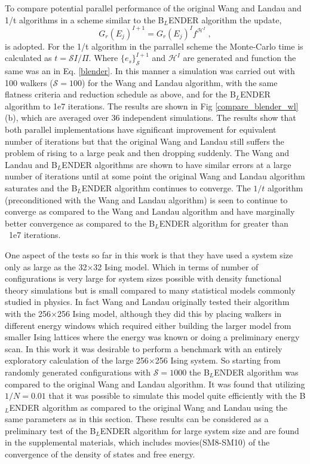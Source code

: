 \documentclass[aps,pre,reprint,superscriptaddress,showkeys]{revtex4-2}
\begin{document}
 To compare potential parallel performance of the original Wang and Landau and 1/t algorithms in a scheme similar to the B$_L$ENDER algorithm the update,
\begin{equation}
G_r(E_j)^{I+1} = G_r(E_j)^{I}f^{\mathcal{H}^I}\;,
\label{parallelscheme}
\end{equation}
is adopted. For the 1/t algorithm in the parrallel scheme the Monte-Carlo time is calculated as $t = \mathcal{S}I/\Pi$. Where $\{e_s\}^{I+1}_{\mathcal{S}}$ and $\mathcal{H}^I$ are generated and function the same was an in Eq. \ref{blender}. In this manner a simulation was carried out with 100 walkers ($\mathcal{S}=100$) for the Wang and Landau algorithm, with the same flatness criteria and reduction schedule as above, and for the B$_L$ENDER algorithm to 1e7 iterations. The results are shown in Fig \ref{compare_blender_wl}(b), which are averaged over 36 independent simulations. The results show that both parallel implementations have significant improvement for equivalent number of iterations but that the original Wang and Landau still suffers the problem of rising to a large peak and then dropping suddenly. The Wang and Landau and B$_L$ENDER algorithms are shown to have similar errors at a large number of iterations until at some point the original Wang and Landau algorithm saturates and the B$_L$ENDER algorithm continues to converge. The $1/t$ algorithm (preconditioned with the Wang and Landau algorithm) is seen to continue to converge as compared to the Wang and Landau algorithm and have marginally better convergence as compared to the B$_L$ENDER algorithm for greater than ~1e7 iterations. 

  One aspect of the tests so far in this work is that they have used a system size only as large as the 32$\times$32 Ising model.  Which in terms of number of configurations is very large for system sizes possible with density functional theory simulations but is small compared to many statistical models commonly studied in physics.  In fact Wang and Landau originally tested their algorithm with the 256$\times$256 Ising model\cite{WL_phys_rev_lett}, although they did this by placing walkers in different energy windows which required either building the larger model from smaller Ising lattices where the energy was known or doing a preliminary energy scan.  In this work it was desirable to perform a benchmark with an entirely exploratory calculation of the large 256$\times$256 Ising system. So starting from randomly generated configurations with $\mathcal{S}=1000$ the B$_L$ENDER algorithm was compared to the original Wang and Landau algorithm. It was found that utilizing $1/N=0.01$ that it was possible to simulate this model quite efficiently with the B$_L$ENDER algorithm as compared to the original Wang and Landau using the same parameters as in this section. These results can be considered as a preliminary test of the B$_L$ENDER algorithm for large system size and are found in the supplemental materials, which includes movies(SM8-SM10) of the convergence of the density of states and free energy. 
\end{document}
